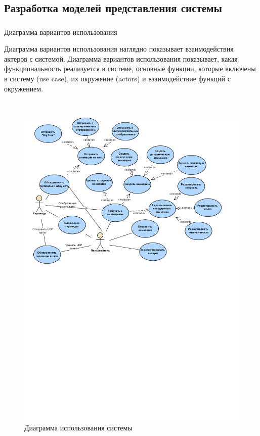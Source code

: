 \subsection{Разработка моделей представления системы}
\label{sec:develop:umlDiagrams}

\subsubsection{} Диаграмма вариантов использования
\label{sec:develop:umlDiagrams:useCase}

Диаграмма вариантов использования наглядно показывает взаимодействия актеров с системой. Диаграмма вариантов использования показывает, какая функциональность реализуется в системе, основные функции, которые включены в систему (use case), их окружение (actors) и взаимодействие функций с окружением.

~
\begin{figure}[H]
\centering
	\includegraphics[scale=0.9]{figures/uml_useCase.pdf}
	\caption{Диаграмма использования системы}
	\label{fig:develop:umlDiagrams:useCase}
\end{figure}

